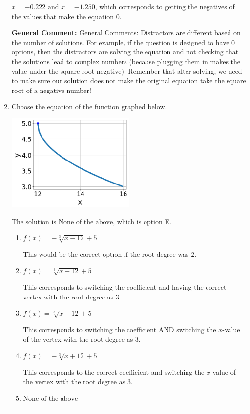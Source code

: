 \documentclass{extbook}[14pt]
\newcommand{\litem}[1]{\item #1

\rule{\textwidth}{0.4pt}}
\begin{document}
\begin{enumerate}
{\begin{enumerate}[label=\Alph*.]
$x = -0.222 \text{ and } x = -1.250$, which corresponds to getting the negatives of the values that make the equation 0.
\end{enumerate}

\textbf{General Comment:} General Comments: Distractors are different based on the number of solutions. For example, if the question is designed to have 0 options, then the distractors are solving the equation and not checking that the solutions lead to complex numbers (because plugging them in makes the value under the square root negative). Remember that after solving, we need to make sure our solution does not make the original equation take the square root of a negative number!
}
\litem{
Choose the equation of the function graphed below.

\begin{center}
    \includegraphics[width=0.5\textwidth]{../Figures/radicalGraphToEquationB.png}
\end{center}


The solution is \( \text{None of the above} \), which is option E.\begin{enumerate}[label=\Alph*.]
\item \( f(x) = - \sqrt[3]{x - 12} + 5 \)

This would be the correct option if the root degree was $2$.
\item \( f(x) = \sqrt[3]{x - 12} + 5 \)

This corresponds to switching the coefficient and having the correct vertex with the root degree as $3$.
\item \( f(x) = \sqrt[3]{x + 12} + 5 \)

This corresponds to switching the coefficient AND switching the $x$-value of the vertex with the root degree as $3$.
\item \( f(x) = - \sqrt[3]{x + 12} + 5 \)

This corresponds to the correct coefficient and switching the $x$-value of the vertex with the root degree as $3$.
\item \( \text{None of the above} \)


\end{enumerate}}
\end{enumerate}
\end{document}
